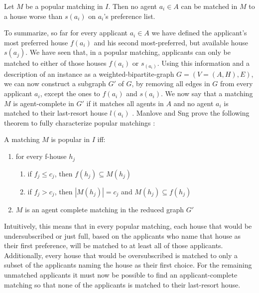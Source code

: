 \newtheorem{lemma-popular-3}[theorem]{Lemma}
\begin{lemma}\label{lemma-popular3}
    Let $M$ be a popular matching in $I$. Then no agent $a_i \in A$ can be matched in $M$ to a house worse than $s(a_i)$ on $a_i$'s preference list.
\end{lemma} 

To summarize, so far for every applicant $a_i \in A$ we have defined the applicant's most preferred house $f(a_i)$ and his second most-preferred, but available house $s(a_j)$. We have seen that, in a popular matching, applicants can only be matched to either of those houses $f(a_i)$ or $s_(a_i)$. Using this information and a description of an instance as a weighted-bipartite-graph $G = (V=(A, H), E)$, we can now construct a subgraph $G'$ of $G$, by removing all edges in $G$ from every applicant $a_i$, except the ones to $f(a_i)$ and $s(a_i)$. We now say that a matching $M$ is agent-complete in $G'$ if it matches all agents in $A$ and no agent $a_i$ is matched to their last-resort house $l(a_i)$ \cite{ManlovePopularMatchings}. Manlove and Sng prove the following theorem to fully characterize popular matchings \cite{ManlovePopularMatchings}:
\newtheorem{theorem-popular-4}[theorem]{Theorem}
\begin{theorem}\label{theorem-popular-4}
    A matching $M$ is popular in $I$ iff:
    \begin{enumerate}
        \item for every f-house $h_j$
        \begin{enumerate}
            \item\label{condition1a} if $f_j \leq c_j$, then $f(h_j) \subseteq M(h_j)$
            \item\label{condition1b} if $f_j > c_j$, then $|M(h_j)| = c_j$ and $M(h_j) \subseteq f(h_j)$
        \end{enumerate}
        \item $M$ is an agent complete matching in the reduced graph $G'$
    \end{enumerate}
\end{theorem} 

Intuitively, this means that in every popular matching, each house that would be undersubscribed or just full, based on the applicants who name that house as their first preference, will be matched to at least all of those applicants. Additionally, every house that would be oversubscribed is matched to only a subset of the applicants naming the house as their first choice. For the remaining unmatched applicants it must now be possible to find an applicant-complete matching so that none of the applicants is matched to their last-resort house.

